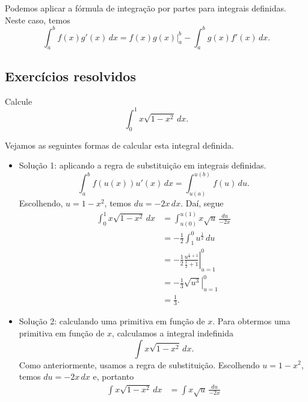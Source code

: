 Podemos aplicar a fórmula de integração por partes para integrais definidas. Neste caso, temos
\begin{equation}
  \int_a^b f(x)g'(x)\,dx = f(x)g(x)|_{a}^b - \int_a^b g(x)f'(x)\,dx.
\end{equation}

\subsection*{Exercícios resolvidos}

\begin{exeresol}
  Calcule
  \begin{equation}
    \int_0^1x\sqrt{1-x^2}\,dx.
  \end{equation}
\end{exeresol}
\begin{resol}
  Vejamos as seguintes formas de calcular esta integral definida.
  \begin{itemize}
  \item Solução 1: aplicando a regra de substituição em integrais definidas.
    \begin{equation}
      \int_a^bf(u(x))u'(x)\,dx = \int_{u(a)}^{u(b)} f(u)\,du.
    \end{equation}
    Escolhendo, $u = 1-x^2$, temos $du = -2x\,dx$. Daí, segue
    \begin{align}
      \int_0^1x\sqrt{1-x^2}\,dx &= \int_{u(0)}^{u(1)}x\sqrt{u}\,\frac{du}{-2x}\\
                                &= -\frac{1}{2}\int_{1}^0 u^{\frac{1}{2}}\,du\\
                                &= -\frac{1}{2}\left.\frac{u^{\frac{1}{2}+1}}{\frac{1}{2}+1}\right|_{u=1}^0\\
                                &= -\frac{1}{3}\left.\sqrt{u^3}\right|_{u=1}^0\\
                                &= \frac{1}{3}.
    \end{align}
  \item Solução 2: calculando uma primitiva em função de $x$.
    Para obtermos uma primitiva em função de $x$, calculamos a integral indefinida
    \begin{equation}
      \int x\sqrt{1-x^2}\,dx.
    \end{equation}
    Como anteriormente, usamos a regra de substituição. Escolhendo $u=1-x^2$, temos $du = -2x\,dx$ e, portanto
    \begin{align}
      \int x\sqrt{1-x^2}\,dx &= \int x\sqrt{u}\,\frac{du}{-2x}\\

\end{align}
\end{itemize}
\end{resol}
